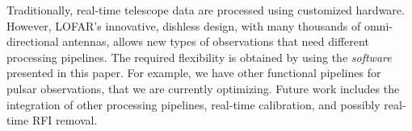 \documentclass{sig-alternate}
\begin{document}

Traditionally, real-time telescope data are processed using customized hardware.
However, LOFAR's innovative, dishless design, with many thousands of
omni-directional antennas, allows new types of observations that need different
processing pipelines.
The required flexibility is obtained by using the \emph{software\/} presented
in this paper.
For example, we have other functional pipelines for pulsar observations, that
we are currently optimizing.
Future work includes the integration of other processing pipelines,
real-time calibration, and possibly real-time RFI removal.
\end{document}
